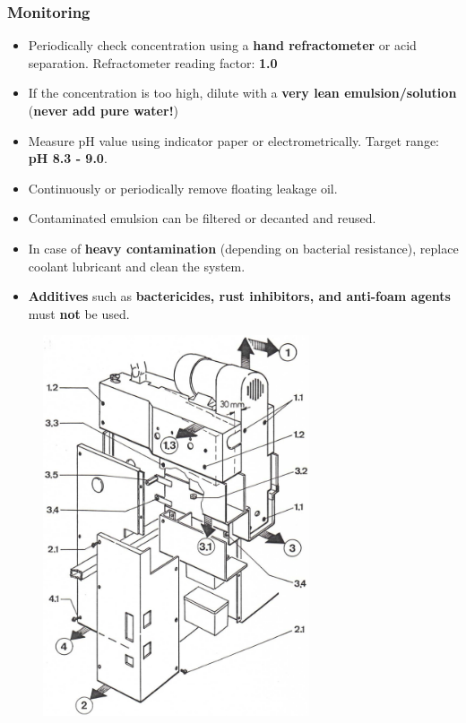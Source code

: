 \subsubsection*{Monitoring}
\begin{itemize}
    \item Periodically check concentration using a \textbf{hand refractometer} or acid separation.  
          Refractometer reading factor: \textbf{1.0}
    \item If the concentration is too high, dilute with a \textbf{very lean emulsion/solution}  
          (\textbf{never add pure water!})
    \item Measure pH value using indicator paper or electrometrically.  
          Target range: \textbf{pH 8.3 - 9.0}.
    \item Continuously or periodically remove floating leakage oil.
    \item Contaminated emulsion can be filtered or decanted and reused.
    \item In case of \textbf{heavy contamination} (depending on bacterial resistance), replace coolant lubricant and clean the system.
    \item \textbf{Additives} such as \textbf{bactericides, rust inhibitors, and anti-foam agents} must \textbf{not} be used.
\end{itemize}


\setcounter{section}{10}

\begin{figure}[H]
    \centering
    \includegraphics[width=0.7\textwidth]{images/chapter7/machine_cover_removal_diagram.jpg}
    \label{fig:machine_cover_removal}
\end{figure}

